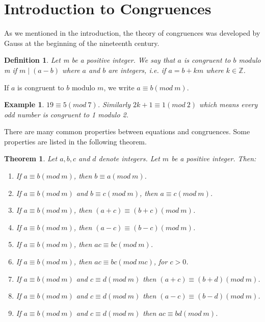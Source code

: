\documentclass[12pt,letterpaper]{book}
\newtheorem{definition}{Definition}
\newtheorem{theorem}{Theorem}
\newtheorem{example}{Example}
\begin{document}
\newpage

\section{Introduction to Congruences}
As we mentioned in the introduction, the theory of congruences was
developed by Gauss at the beginning of the nineteenth century.
\begin{definition}
Let m be a positive integer. We say that $a$ is congruent to $b$
modulo m if $m \mid (a-b)$ where $a$ and $b$ are integers, i.e. if $a=b+km$ where $k\in \mathbb{Z}$.
\end{definition}
 If $a$ is congruent to $b$ modulo $m$, we write
$a\equiv b(mod\ m)$.

\begin{example}
$19\equiv 5 (mod \ 7)$.  Similarly $2k+1 \equiv 1 (mod\ 2)$ which
means every odd number is congruent to 1 modulo 2.
\end{example}

There are many common properties between equations and congruences.
Some properties are listed in the following theorem.

\begin{theorem} \label{cong}
Let $a, b, c$ and $d$ denote integers.  Let $m$ be a
positive integer.  Then:

\begin{enumerate}
\item{If $a \equiv b(mod \ m)$, then $b\equiv a (mod \ m)$.}
\item{If $a\equiv b(mod \ m)$ and $b\equiv c(mod \ m)$, then
$a\equiv c (mod \ m)$.}
\item{If $a\equiv b(mod\ m)$, then $(a+c)
\equiv (b+c) (mod \ m)$.}
\item{If $a\equiv b(mod\ m)$, then $(a-c)
\equiv (b-c) (mod \ m)$.}
\item{If $a\equiv b(mod\ m)$, then $ac
\equiv bc (mod \ m)$.}
\item{If $a\equiv b(mod\ m)$, then $ac \equiv
bc (mod \ mc)$, for $c>0$.}
\item{If $a\equiv b(mod\ m)$ and $c
\equiv d (mod \ m)$ then $(a+c) \equiv (b+d) (mod \ m)$.}
\item{If
$a\equiv b(mod\ m)$ and $c \equiv d (mod \ m)$ then $(a-c) \equiv (b-d)
(mod \ m)$.}
\item{If $a\equiv b(mod\ m)$ and $c \equiv d (mod \ m)$
then $ac \equiv bd (mod \ m)$.}
\end{enumerate}
\end{theorem}
\end{document}
